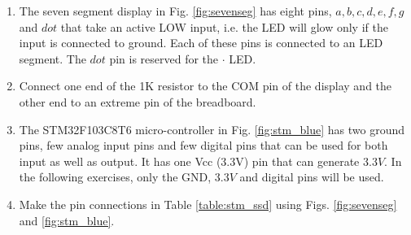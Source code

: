 \documentclass[journal,12pt,twocolumn]{IEEEtran}
\renewcommand\thesection{\arabic{section}}
\renewcommand\thesubsection{\thesection.\arabic{subsection}}
\begin{document}
\renewcommand{\theequation}{\theenumi}
\renewcommand{\thefigure}{\theenumi}
\begin{enumerate}[label=\thesubsection.\arabic*.,ref=\thesubsection.\theenumi]
\item The seven segment display in Fig. \ref{fig:sevenseg} has eight pins, $a, b, c, d, e, f, g$ and $dot$ that take an active LOW input, i.e.  the LED will glow only if the input is connected to ground.  Each of these pins is connected to an LED segment.  The $dot$ pin is  reserved for the $\cdot$ LED.  

%


\item Connect one end of the 1K resistor to the COM pin of the display and the other end to an extreme pin of the breadboard.	
%
%
%
%

\item The STM32F103C8T6 micro-controller in Fig. \ref{fig:stm_blue} has two ground pins, few analog input pins and few digital pins that can be used for both input as well as output. It has one Vcc (3.3V) pin that can generate 3.3$V$.  In the following exercises, only the GND, 3.3$V$ and digital pins will be used.
%
%
\item Make the pin connections in Table \ref{table:stm_ssd} using Figs. \ref{fig:sevenseg} and \ref{fig:stm_blue}.
	

\end{enumerate}
\end{document}
